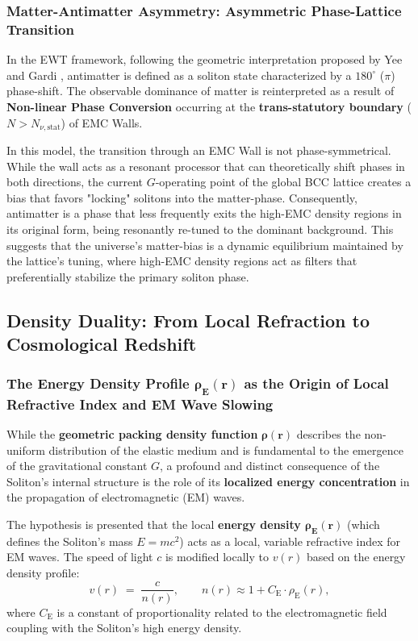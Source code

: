 \documentclass[10pt,a4paper]{article}
\begin{document}
\subsubsection*{Matter-Antimatter Asymmetry: Asymmetric Phase-Lattice Transition}
In the EWT framework, following the geometric interpretation proposed by Yee and Gardi \cite{yee2019geometry}, antimatter is defined as a soliton state characterized by a $180^\circ$ ($\pi$) phase-shift. The observable dominance of matter is reinterpreted as a result of \textbf{Non-linear Phase Conversion} occurring at the \textbf{trans-statutory boundary} ($N > N_{\nu, \text{stat}}$) of EMC Walls.

In this model, the transition through an EMC Wall is not phase-symmetrical. While the wall acts as a resonant processor that can theoretically shift phases in both directions, the current $G$-operating point of the global BCC lattice creates a bias that favors "locking" solitons into the matter-phase. Consequently, antimatter is a phase that less frequently exits the high-EMC density regions in its original form, being resonantly re-tuned to the dominant background. This suggests that the universe's matter-bias is a dynamic equilibrium maintained by the lattice's tuning, where high-EMC density regions act as filters that preferentially stabilize the primary soliton phase.

\subsection{Density Duality: From Local Refraction to Cosmological Redshift}
\label{sec:density_duality_refraction}

\subsubsection*{The Energy Density Profile $\mathbf{\rho_{\text{E}}(r)}$ as the Origin of Local Refractive Index and EM Wave Slowing}
\label{sec:refractive_index_link}

While the \textbf{geometric packing density function} $\mathbf{\rho(r)}$ describes the non-uniform distribution of the elastic medium and is fundamental to the emergence of the gravitational constant $G$, a profound and distinct consequence of the Soliton's internal structure is the role of its \textbf{localized energy concentration} in the propagation of electromagnetic (EM) waves.

The hypothesis is presented that the local \textbf{energy density $\mathbf{\rho_{\text{E}}(r)}$} (which defines the Soliton's mass $E=mc^2$) acts as a local, variable refractive index for EM waves. The speed of light $c$ is modified locally to $v(r)$ based on the energy density profile:
\begin{equation}
	\label{eq:velocity_index}
	v(r) \;=\; \frac{c}{n(r)}, \qquad n(r) \approx 1 + C_{\text{E}} \cdot \rho_{\text{E}}(r),
\end{equation}
where $C_{\text{E}}$ is a constant of proportionality related to the electromagnetic field coupling with the Soliton's high energy density.
\end{document}

